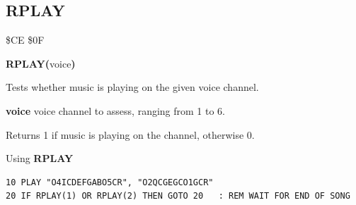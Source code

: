 \subsection{RPLAY}
\begin{description}[leftmargin=2cm,style=nextline]
\item [Token:]    \$CE \$0F

\item [Format:]   {\bf RPLAY(}voice{\bf)}

\item [Returns:]  Tests whether music is playing on the given voice channel.

                  {\bf voice} voice channel to assess, ranging from 1 to 6.

                  Returns 1 if music is playing on the channel, otherwise 0.

\item [Example:]  Using {\bf RPLAY}

\begin{tcolorbox}[colback=black,coltext=white]
\verbatimfont{\codefont}
\begin{verbatim}
10 PLAY "O4ICDEFGABO5CR", "O2QCGEGCO1GCR"
20 IF RPLAY(1) OR RPLAY(2) THEN GOTO 20   : REM WAIT FOR END OF SONG
\end{verbatim}
\end{tcolorbox}
\end{description}


\newpage
